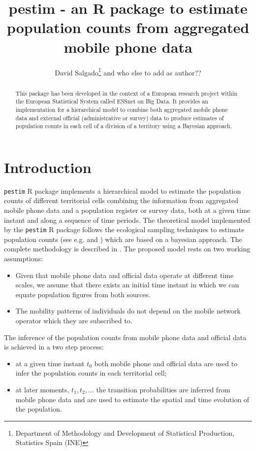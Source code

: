 \documentclass[12pt, a4paper]{article}
\title{pestim - an R package to estimate population counts from aggregated mobile phone data}
\author{David Salgado\footnote{Department of Methodology and Development of Statistical Production, Statistics Spain (INE)}  and who else to add as author??}
\date{}
\begin{document}
\maketitle

\begin{abstract}
This package has been developed in the context of a European research project 
within the European Statistical System called ESSnet on Big Data.
It provides an implementation for a hierarchical model to combine both 
aggregated mobile phone data and external official (administrative or survey) 
data to produce estimates of population counts in each cell of a division of a territory using a Bayesian approach.
\end{abstract}


\section{Introduction}

\texttt{pestim} R package implements a hierarchical model to estimate the population counts of different territorial cells 
combining the information from aggregated 
mobile phone data and a population register or survey data, both at a given time instant and along a 
sequence of time periods. The theoretical model implemented by the \texttt{pestim} R package
follows the ecological sampling techniques to estimate population counts (see e.g. \cite{ManNacAlb15a} and 
\cite{RoyDor08a}) which are based on a bayesian approach. The complete methodology is described in \cite{methodology}.
The proposed model rests on two working assumptions:
\begin{itemize}
	\item Given that mobile phone data and official data operate at different 
time scales, we assume that there exists an initial time instant 
in which we can equate population figures from both sources.
	\item The mobility patterns of individuals do not depend on the mobile 
network operator which they are subscribed to.
\end{itemize}

The inference of the population counts from mobile phone data and official data is achieved in a two step process:
\begin{itemize}
	\item {at a given time instant $t_{0}$ both mobile phone and 
official data are used to infer the population counts in each territorial cell;}
	\item {at later moments, $t_{1}, t_{2},...$ the transition probabilities are inferred from mobile phone 
	data and are used to estimate the spatial and time evolution of the population.}
\end{itemize}
\end{document}
